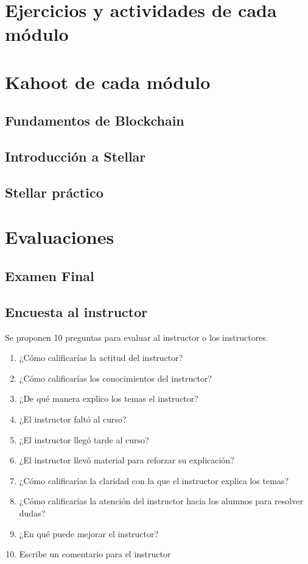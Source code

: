 \documentclass[a4paper,12pt]{/home/armando/Documentos/Cursos/LaTeX/Plantillas/lib/pub}
\begin{document}
\section{Ejercicios y actividades de cada módulo}

\section{Kahoot de cada módulo}
	\subsection{Fundamentos de Blockchain}
	\subsection{Introducción a Stellar}
	\subsection{Stellar práctico}

\section{Evaluaciones}
	\subsection{Examen Final}
	\subsection{Encuesta al instructor}
	Se proponen 10 preguntas para evaluar al instructor o los instructores.
	\begin{enumerate}
		\item ¿Cómo calificarías la actitud del instructor?
		\item ¿Cómo calificarías los conocimientos del instructor?
		\item ¿De qué manera explico los temas el instructor?
		\item ¿El instructor faltó al curso?
		\item ¿El instructor llegó tarde al curso?
		\item ¿El instructor llevó material  para reforzar su explicación?
		\item ¿Cómo calificarías la claridad con la que el instructor explica los temas?
		\item ¿Cómo calificarías la atención del instructor hacia los alumnos para resolver dudas?
		\item ¿En qué puede mejorar el instructor?
		\item Escribe un comentario para el instructor
	\end{enumerate}
	
\end{document}
